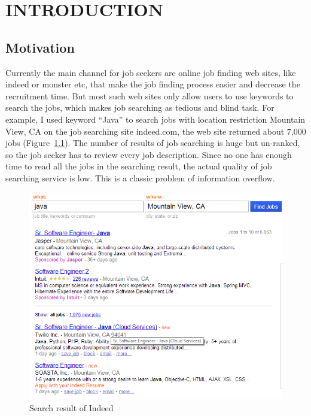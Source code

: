 \chapter{INTRODUCTION}




\section{Motivation}
Currently the main channel for job seekers are online job finding web sites, like indeed or  monster etc, that make the job finding process easier and decrease the recruitment time. But most such web sites only allow users to use keywords to search the jobs, which makes job searching as tedious and blind task. For example, I used keyword ``Java'' to search jobs with location restriction Mountain View, CA on the job searching site indeed.com, the web site returned about 7,000 jobs (Figure~\ref{fig:Indeed}). The number of results of job searching is huge but un-ranked, so the job seeker has to review every job description. Since no one has enough time to read all the jobs in the searching result, the actual quality of job searching service is low. This is a classic problem of information overflow.


\begin{figure}[htbp]
  \centering
  \includegraphics[scale=0.4]{images/indeed1.png}
  \caption{Search result of Indeed}
  \label{fig:Indeed}
\end{figure}

